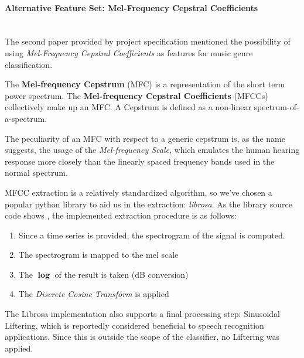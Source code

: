 \documentclass[12pt]{article}
\begin{document}
	\paragraph{Alternative Feature Set: Mel-Frequency Cepstral Coefficients}\mbox{}\\\newline
	The second paper provided by project specification \cite{classification} mentioned the possibility of using \textit{Mel-Frequency Cepstral Coefficients} as features for music genre classification.
	
	The \textbf{Mel-frequency Cepstrum} (MFC) is a representation of the short term power spectrum. The \textbf{Mel-frequency Cepstral Coefficients} (MFCCs) collectively make up an MFC. A Cepstrum is defined as a non-linear spectrum-of-a-spectrum.
	
	The peculiarity of an MFC with respect to a generic cepstrum is, as the name suggests, the usage of the \textit{Mel-frequency Scale}, which emulates the human hearing response more closely than the linearly spaced frequency bands used in the normal spectrum.
	
	MFCC extraction is a relatively standardized algorithm, so we've chosen a popular python library to aid us in the extraction: \textit{librosa}. As the library source code shows \cite{librosarepo}, the implemented extraction procedure is as follows:
	\begin{enumerate}
	\item Since a time series is provided, the spectrogram of the signal is computed.
	\item The spectrogram is mapped to the mel scale
	\item The $\mathbf{\log}$ of the result is taken (dB conversion)
	\item The \textit{Discrete Cosine Transform} is applied
	\end{enumerate}
	
	The Librosa implementation also supports a final processing step: Sinusoidal Liftering, which is reportedly considered beneficial to speech recognition applications. Since this is outside the scope of the classifier, no Liftering was applied.
	
\end{document}
